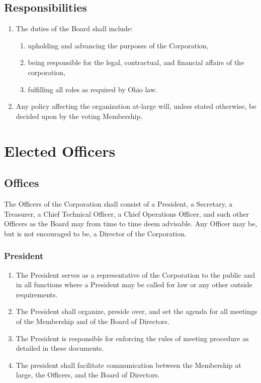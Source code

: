 \documentclass{article}
\begin{document}
\subsection{Responsibilities}
\begin{enumerate}
  \item The duties of the Board shall include:
  \begin{enumerate}
    \item upholding and advancing the purposes of the Corporation,
    \item being responsible for the legal, contractual, and financial affairs of
    the corporation,
    \item fulfilling all roles as required by Ohio law.
  \end{enumerate}
  \item Any policy affecting the organization at-large will, unless stated
  otherwise, be decided upon by the voting Membership.
\end{enumerate}
\section{Elected Officers}
\subsection{Offices}
The Officers of the Corporation shall consist of a President, a Secretary, a Treasurer, a 
Chief Technical Officer, a Chief Operations Officer, and such other Officers as the Board 
may from time to time deem advisable.  Any Officer may be, but is not encouraged to be, a 
Director of the Corporation.
\subsubsection{President}
\begin{enumerate}
  \item The President serves as a representative of the Corporation to the public and in all 
functions where a President may be called for law or any other outside requirements.
  \item The President shall organize, preside over, and set the agenda for all meetings of 
the Membership and of the Board of Directors.
  \item The President is responsible for enforcing the rules of meeting procedure as 
detailed in these documents.
  \item The president shall facilitate communication between the Membership at large, the 
Officers, and the Board of Directors.
\end{enumerate}
\end{document}
